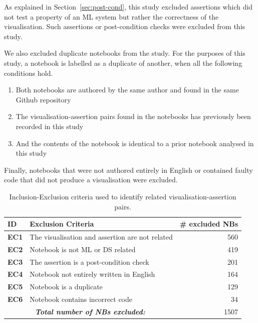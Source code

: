 \documentclass[conference]{IEEEtran}
\begin{document}
As explained in Section~\ref{sec:post-cond}, this study excluded assertions which did not test a property of an ML system but rather the correctness of the visualisation. Such assertions or post-condition checks were excluded from this study.

We also excluded duplicate notebooks from the study. For the purposes of this study, a notebook is labelled as a duplicate of another, when all the following conditions hold.

\begin{enumerate}
  \item Both notebooks are authored by the same author and found in the same Github repository
  \item The visualisation-assertion pairs found in the notebooks has previously been recorded in this study
  \item And the contents of the notebook is identical to a prior notebook analysed in this study
\end{enumerate}

Finally, notebooks that were not authored entirely in English or contained faulty code that did not produce a visualisation were excluded.

\begin{table}
  \centering
  \caption{Inclusion-Exclusion criteria used to identify related visualisation-assertion pairs.}\label{tab:exclusion-criteria}
  \begin{tabularx}{0.47\textwidth}{@{}l X r@{}}
    \toprule
    \textbf{ID} &
    \textbf{Exclusion Criteria} &
    \textbf{\# excluded NBs}\\
    \midrule
    \textbf{EC1} &
    The visualisation and assertion are not related &
    560\\
    \textbf{EC2} &
    Notebook is not ML or DS related &
    419\\
    \textbf{EC3} &
    The assertion is a post-condition check &
    201\\
    \textbf{EC4} &
    Notebook not entirely written in English &
    164\\
    \textbf{EC5} &
    Notebook is a duplicate &
    129\\
    \textbf{EC6} &
    Notebook contains incorrect code &
    34\\
    \midrule
    \multicolumn{2}{c}{\emph{\textbf{Total number of NBs excluded:}}} &
    1507\\
    \bottomrule
  \end{tabularx}
\end{table}
\end{document}
